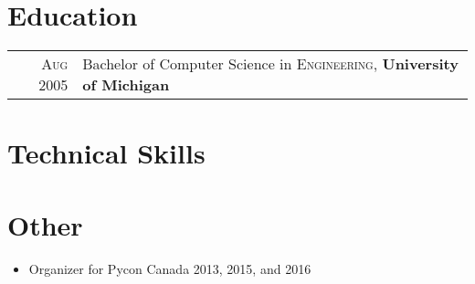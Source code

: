 \documentclass[a4paper,10pt]{article}
\begin{document}
    
        \section{Education}
        \begin{tabular}{rl}
        \textsc{Aug} 2005 & Bachelor of Computer Science in \textsc{Engineering}, \textbf{University of Michigan}\\
        \end{tabular}
    

    
        \section{Technical Skills}

              
            
          

    
    \section {Other}
    \begin{itemize}
        \item Organizer for Pycon Canada 2013, 2015, and 2016
    \end{itemize}
    
\end{document}
